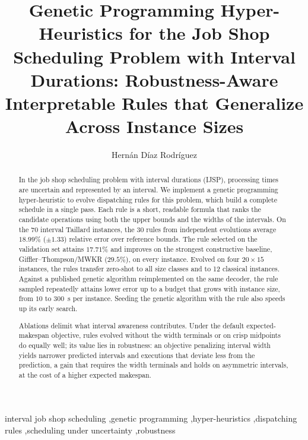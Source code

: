 \documentclass[review,authoryear,11pt]{elsarticle}
\begin{document}
\begin{frontmatter}

\title{Genetic Programming Hyper-Heuristics for the Job Shop Scheduling
Problem with Interval Durations: Robustness-Aware Interpretable Rules
that Generalize Across Instance Sizes}

\author{Hern\'an D\'iaz Rodr\'iguez}

\begin{abstract}
In the job shop scheduling problem with interval durations (IJSP),
processing times are uncertain and represented by an interval. We
implement a genetic programming
hyper-heuristic to evolve dispatching rules for this problem, which build
a complete schedule in a single pass. Each rule is a
short, readable formula that ranks the candidate operations using both
the upper bounds and the widths of the intervals. On the 70
interval Taillard instances, the 30 rules from independent evolutions
average $18.99\%$ ($\pm1.33$) relative error over reference
bounds. The rule selected on the validation set attains $17.71\%$ and
improves on the strongest constructive baseline, Giffler--Thompson/MWKR
($29.5\%$), on every instance. Evolved on four $20{\times}15$ instances,
the rules transfer zero-shot to all size classes and to 12 classical
instances. Against a published genetic algorithm reimplemented on the same
decoder, the rule sampled repeatedly attains lower error up to a budget
that grows with instance size, from $10$ to $300$~s per instance.
Seeding the genetic algorithm with the rule also speeds up its early
search.

Ablations delimit what interval awareness
contributes. Under the default expected-makespan objective, rules
evolved without the width terminals or on crisp midpoints do equally
well; its value lies
in robustness: an objective penalizing interval width yields narrower
predicted intervals and executions that deviate less from the
prediction, a gain
that requires the width terminals and holds on asymmetric intervals, at
the cost of a higher expected makespan.
\end{abstract}

\begin{keyword}
interval job shop scheduling \sep genetic programming \sep hyper-heuristics
\sep dispatching rules \sep scheduling under uncertainty \sep robustness
\end{keyword}

\end{frontmatter}
\end{document}

